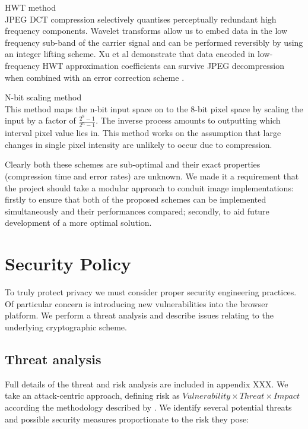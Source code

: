 \begin{sdesc}

    \item[HWT method] \hfill \\ JPEG DCT compression selectively quantises perceptually redundant high frequency components. Wavelet transforms allow us to embed data in the low frequency sub-band of the carrier signal and can be performed reversibly by using an integer lifting scheme. Xu et al demonstrate that data encoded in low-frequency HWT approximation coefficients can survive JPEG decompression when combined with an error correction scheme \cite{haar}.
    
    \item[N-bit scaling method] \hfill \\ This method maps the n-bit input space on to the 8-bit pixel space by scaling the input by a factor of $ \frac{2^8 - 1}{2^n - 1}$. The inverse process amounts to outputting which interval pixel value lies in. This method works on the assumption that large changes in single pixel intensity are unlikely to occur due to compression.

\end{sdesc}

Clearly both these schemes are sub-optimal and their exact properties (compression time and error rates) are unknown. We made it a requirement that the project should take a modular approach to conduit image implementations: firstly to ensure that both of the proposed schemes can be implemented simultaneously and their performances compared; secondly, to aid future development of a more optimal solution.



\FloatBarrier 
\section{Security Policy}
\label{sec:security}

To truly protect privacy we must consider proper security engineering practices. Of particular concern is introducing new vulnerabilities into the browser platform. We perform a threat analysis and describe issues relating to the underlying cryptographic scheme.

\FloatBarrier
\subsection{Threat analysis}
\label{ssec:threat}

Full details of the threat and risk analysis are included in appendix XXX. We take an attack-centric approach, defining risk as $Vulnerability \times Threat \times Impact$ according the methodology described by \cite{security}. We identify several potential threats and possible security measures proportionate to the risk they pose:



